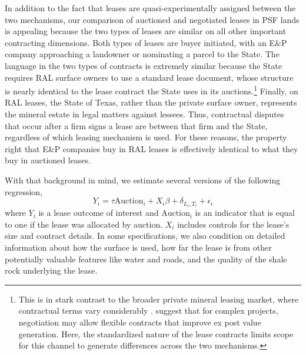 \documentclass[12pt]{article}
\begin{document}
In addition to the fact that leases are quasi-experimentally assigned between the two mechanisms, our comparison of auctioned and negotiated leases in PSF lands is appealing because the two types of leases are similar on all other important contracting dimensions. Both types of leases are buyer initiated, with an E\&P company approaching a landowner or nominating a parcel to the State. The language in the two types of contracts is extremely similar because the State requires RAL surface owners to use a standard lease document, whose structure is nearly identical to the lease contract the State uses in its auctions.\footnote{This is in stark contrast to the broader private mineral leasing market, where contractual terms vary considerably \citep{timmins2017environmental}. \citet{bajari_auctions_2009} suggest that for complex projects, negotiation may allow flexible contracts that improve ex post value generation. Here, the standardized nature of the lease contracts limits scope for this channel to generate differences across the two mechanisms.} Finally, on RAL leases, the State of Texas, rather than the private surface owner, represents the mineral estate in legal matters against lessees.  Thus, contractual disputes that occur after a firm signs a lease are between that firm and the State, regardless of which leasing mechanism is used. For these reasons, the property right that E\&P companies buy in RAL leases is effectively identical to what they buy in auctioned leases. 

With that background in mind, we estimate several versions of the following regression,
\begin{equation}
 	Y_i = \tau \text{Auction}_i + X_i \beta + \delta_{L_i,T_i} + \epsilon_i \label{eq:mainAuction}
\end{equation}
where $Y_i$ is a lease outcome of interest and $\text{Auction}_i$ is an indicator that is equal to one if the lease was allocated by auction. $X_i$ includes controls for the lease's size and contract details. In some specifications, we also condition on detailed information about how the surface is used, how far the lease is from other potentially valuable features like water and roads, and the quality of the shale rock underlying the lease. 
\end{document}
